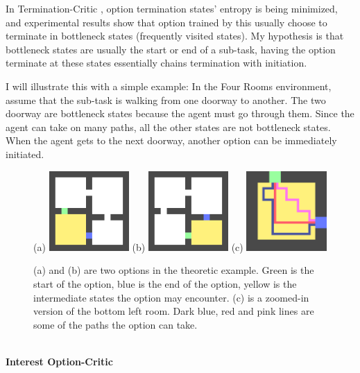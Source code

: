 \documentclass{article}
\begin{document}
	\normalsize{\quad In Termination-Critic \cite{harutyunyan2019termination}, option termination states' entropy is being minimized, and experimental results show that option trained by this usually choose to terminate in bottleneck states (frequently visited states). My hypothesis is that bottleneck states are usually the start or end of a sub-task, having the option terminate at these states essentially chains termination with initiation.
		
	\quad I will illustrate this with a simple example: In the Four Rooms environment, assume that the sub-task is walking from one doorway to another. The two doorway are bottleneck states because the agent must go through them. Since the agent can take on many paths, all the other states are not bottleneck states. When the agent gets to the next doorway, another option can be immediately initiated.}
	\begin{figure}[h]
		\centering
		\large{(a)}
		\includegraphics[width=1.2in]{termCrit1.png}
		\hspace{0.2in}
		\large{(b)}
		\includegraphics[width=1.2in]{termCrit2.png}
		\hspace{0.2in}
		\large{(c)}
		\includegraphics[width=1.2in]{termCrit3.png}
		\caption{(a) and (b) are two options in the theoretic example. Green is the start of the option, blue is the end of the option, yellow is the intermediate states the option may encounter. (c) is a zoomed-in version of the bottom left room. Dark blue, red and pink lines are some of the paths the option can take.}
	\end{figure}\vspace{0.15in}\\
	\large{\bfseries{Interest Option-Critic}}\vspace{0.05in}
\end{document}
